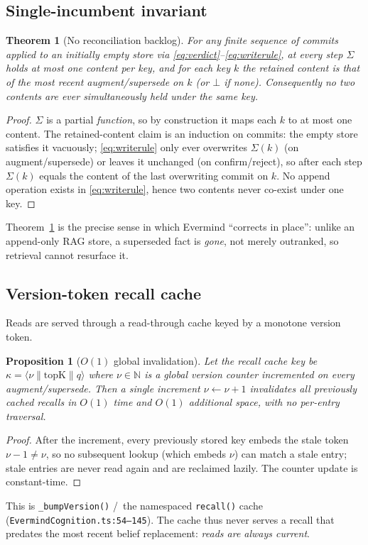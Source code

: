 \documentclass[journal,onecolumn,11pt]{IEEEtran}
\newtheorem{proposition}{Proposition}
\newtheorem{theorem}{Theorem}
\begin{document}
\subsection{Single-incumbent invariant}
\begin{theorem}[No reconciliation backlog]
\label{thm:invariant}
For any finite sequence of commits applied to an initially empty store via
\eqref{eq:verdict}--\eqref{eq:writerule}, at every step $\Sigma$ holds at most one
content per key, and for each key $k$ the retained content is that of the most
recent \textsf{augment}/\textsf{supersede} on $k$ (or $\bot$ if none).
Consequently no two contents are ever simultaneously held under the same key.
\end{theorem}
\begin{proof}
$\Sigma$ is a partial \emph{function}, so by construction it maps each $k$ to at
most one content. The retained-content claim is an induction on commits: the
empty store satisfies it vacuously; \eqref{eq:writerule} only ever overwrites
$\Sigma(k)$ (on \textsf{augment}/\textsf{supersede}) or leaves it unchanged (on
\textsf{confirm}/\textsf{reject}), so after each step $\Sigma(k)$ equals the
content of the last overwriting commit on $k$. No append operation exists in
\eqref{eq:writerule}, hence two contents never co-exist under one key.
\end{proof}
Theorem~\ref{thm:invariant} is the precise sense in which Evermind ``corrects in
place'': unlike an append-only RAG store, a superseded fact is \emph{gone}, not
merely outranked, so retrieval cannot resurface it.

\subsection{Version-token recall cache}
Reads are served through a read-through cache keyed by a monotone version token.
\begin{proposition}[$O(1)$ global invalidation]
\label{prop:invalidate}
Let the recall cache key be $\kappa=\langle \nu \parallel \text{topK} \parallel
q\rangle$ where $\nu\in\mathbb{N}$ is a global version counter incremented on
every \textsf{augment}/\textsf{supersede}. Then a single increment
$\nu\leftarrow\nu+1$ invalidates \emph{all} previously cached recalls in $O(1)$
time and $O(1)$ additional space, with no per-entry traversal.
\end{proposition}
\begin{proof}
After the increment, every previously stored key embeds the stale token
$\nu-1\neq\nu$, so no subsequent lookup (which embeds $\nu$) can match a stale
entry; stale entries are never read again and are reclaimed lazily. The counter
update is constant-time.
\end{proof}
This is \texttt{\_bumpVersion()} /\ the namespaced \texttt{recall()} cache
(\texttt{EvermindCognition.ts:54--145}). The cache thus never serves a recall
that predates the most recent belief replacement: \emph{reads are always
current}.
\end{document}
